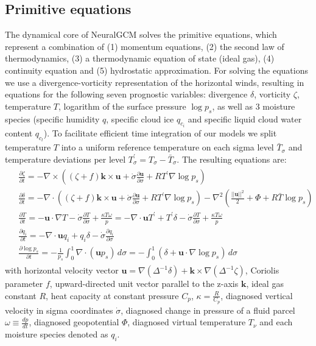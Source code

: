 \documentclass[sn-nature,Numbered]{sn-jnl}%
\newcommand{\pd}[2]{\frac{\partial#1}{\partial#2}}
\begin{document}
\begin{appendices}
\subsection{Primitive equations}\label{apx:subsec:dycore_equations}
The dynamical core of NeuralGCM solves the primitive equations, which represent a combination of (1) momentum equations, (2) the second law of thermodynamics, (3) a thermodynamic equation of state (ideal gas), (4) continuity equation and (5) hydrostatic approximation. For solving the equations we use a divergence-vorticity representation of the horizontal winds, resulting in equations for the following seven prognostic variables: divergence $\delta$, vorticity $\zeta$, temperature $T$, logarithm of the surface pressure $\log p_{s}$, as well as $3$ moisture species (specific humidity $q$, specific cloud ice $q_{c_i}$ and specific liquid cloud water content $q_{c_l}$). To facilitate efficient time integration of our models we split temperature $T$ into a uniform reference temperature on each sigma level $\bar{T}_{\sigma}$ and temperature deviations per level $T^{\prime}_{\sigma} = T_\sigma - \bar{T}_{\sigma}$. The resulting equations are:
\begin{align}
\begin{split}
&\pd{\zeta}{t} =-\nabla\times\left((\zeta + f)\mathbf k\times\mathbf u
    +\dot\sigma\frac{\partial\mathbf u}{\partial\sigma} + RT^\prime\nabla\log p_s \right) \\
&\pd{\delta}{t} =-\nabla\cdot\left((\zeta + f)\mathbf k\times\mathbf u
    +\dot\sigma\frac{\partial\mathbf u}{\partial\sigma} + RT^\prime\nabla\log p_s \right)
    -\nabla^2\left(\frac{||\mathbf u||^2}{2} + \Phi + R \bar{T}\log p_s \right) \\
&\pd{T}{t} =-\mathbf u\cdot\nabla T -\dot\sigma \frac{\partial T}{\partial \sigma}
    +\frac{\kappa T\omega}{p} =-\nabla\cdot \mathbf u T^\prime + T^\prime\delta
    -\dot\sigma \frac{\partial T}{\partial \sigma} +\frac{\kappa T\omega}{p} \\
&\pd{q_i}{t} =-\nabla\cdot \mathbf{u}q_{i} + q_{i}\delta -\dot{\sigma}\pd{q_{i}}{\sigma}  \\
&\pd{\log p_s}{t} =-\frac{1}{p_s}\int_0^1\nabla\cdot(\mathbf up_s)\,d\sigma
    =-\int_0^1\left(\delta +\mathbf u\cdot\nabla\log p_s\right)\,d\sigma
\label{eq:primitive_equations}
\end{split}
\end{align}
with horizontal velocity vector $\mathbf{u}=\nabla(\Delta^{-1}\delta) + \mathbf{k} \times\nabla(\Delta^{-1}\zeta)$, Coriolis parameter $f$, upward-directed unit vector parallel to the z-axis $\mathbf{k}$, ideal gas constant $R$, heat capacity at constant pressure $C_{p}$,  $\kappa= \frac{R}{C_{p}}$, diagnosed vertical velocity in sigma coordinates $\dot{\sigma}$, diagnosed change in pressure of a fluid parcel $\omega \equiv \frac{dp}{dt}$, diagnosed geopotential $\Phi$, diagnosed virtual temperature $T_{\nu}$ and each moisture species denoted as $q_{i}$.


\end{appendices}
\end{document}
